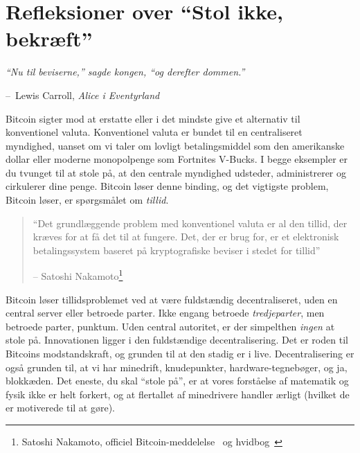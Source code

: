 \documentclass[paper=6in:9in,pagesize=pdftex,
               headinclude=on,footinclude=on,12pt]{scrbook}
\makeatletter
\newenvironment{chapquote}[2][4em]{\setlength{\@tempdima}{#1}%
   \def\chapquote@author{#2}%
   \parshape 1 \@tempdima \dimexpr\textwidth-2\@tempdima\relax%
   \itshape}{\par\normalfont\hfill--\ \chapquote@author\hspace*{\@tempdima}\par\bigskip}
\makeatother
\begin{document}
\chapter{Refleksioner over \enquote{Stol ikke, bekræft}}
\label{les:16}

\begin{chapquote}{Lewis Carroll, \textit{Alice i Eventyrland}} \enquote{Nu til beviserne,} sagde kongen, \enquote{og derefter dommen.} \end{chapquote}

Bitcoin sigter mod at erstatte eller i det mindste give et alternativ til konventionel valuta. Konventionel valuta er bundet til en centraliseret myndighed, uanset om vi taler om lovligt betalingsmiddel som den amerikanske dollar eller moderne monopolpenge som Fortnites V-Bucks. I begge eksempler er du tvunget til at stole på, at den centrale myndighed udsteder, administrerer og cirkulerer dine penge. Bitcoin løser denne binding, og det vigtigste problem, Bitcoin løser, er spørgsmålet om \textit{tillid}.\begin{quotation}\begin{samepage} \enquote{Det grundlæggende problem med konventionel valuta er al den tillid, der kræves for at få det til at fungere. \href{...}{} Det, der er brug for, er et elektronisk betalingssystem baseret på kryptografiske beviser i stedet for tillid} \begin{flushright} -- Satoshi Nakamoto\footnote{Satoshi Nakamoto, officiel Bitcoin-meddelelse~\cite{bitcoin-announcement} og hvidbog~\cite{whitepaper}}
\end{flushright}\end{samepage}\end{quotation}

Bitcoin løser tillidsproblemet ved at være fuldstændig decentraliseret, uden en central server eller betroede parter. Ikke engang betroede \textit{tredjeparter}, men betroede parter, punktum. Uden central autoritet, er der simpelthen \textit{ingen} at stole på. Innovationen ligger i den fuldstændige decentralisering. Det er roden til Bitcoins modstandskraft, og grunden til at den stadig er i live. Decentralisering er også grunden til, at vi har minedrift, knudepunkter, hardware-tegnebøger, og ja, blokkæden. Det eneste, du skal \enquote{stole på}, er at vores forståelse af matematik og fysik ikke er helt forkert, og at flertallet af minedrivere handler ærligt (hvilket de er motiverede til at gøre).
\end{document}
